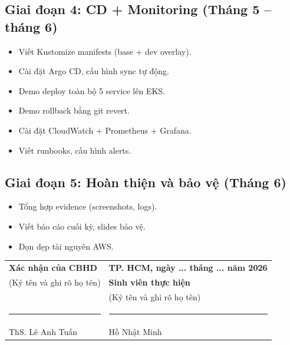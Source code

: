 \documentclass[12pt,a4paper]{article}
\begin{document}
\subsection{Giai đoạn 4: CD + Monitoring (Tháng 5 -- tháng 6)}
\begin{itemize}[leftmargin=*,nosep]
  \item Viết Kustomize manifests (base + dev overlay).
  \item Cài đặt Argo CD, cấu hình sync tự động.
  \item Demo deploy toàn bộ 5 service lên EKS.
  \item Demo rollback bằng git revert.
  \item Cài đặt CloudWatch + Prometheus + Grafana.
  \item Viết runbooks, cấu hình alerts.
\end{itemize}

\subsection{Giai đoạn 5: Hoàn thiện và bảo vệ (Tháng 6)}
\begin{itemize}[leftmargin=*,nosep]
  \item Tổng hợp evidence (screenshots, logs).
  \item Viết báo cáo cuối kỳ, slides bảo vệ.
  \item Dọn dẹp tài nguyên AWS.
\end{itemize}

\vspace{16pt}

\begin{center}
\begin{tabular}{p{7cm} p{7cm}}
  \textbf{Xác nhận của CBHD} & \textbf{TP. HCM, ngày ... tháng ... năm 2026} \\
  (Ký tên và ghi rõ họ tên)   & \textbf{Sinh viên thực hiện} \\
                               & (Ký tên và ghi rõ họ tên) \\[40pt]
  \rule{6cm}{0.3pt}           & \rule{6cm}{0.3pt} \\
  \small ThS. Lê Anh Tuấn     & \small Hồ Nhật Minh \\
\end{tabular}
\end{center}
\end{document}
